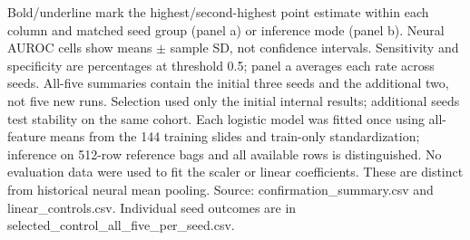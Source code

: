 \begin{table}[H]
\begin{tabularx}{\textwidth}{@{}>{\raggedright\arraybackslash}Xlcccc@{}}
\bottomrule
\end{tabularx}
\par\medskip\footnotesize Bold/underline mark the highest/second-highest point estimate within each column and matched seed group (panel a) or inference mode (panel b). Neural AUROC cells show means $\pm$ sample SD, not confidence intervals. Sensitivity and specificity are percentages at threshold 0.5; panel a averages each rate across seeds. All-five summaries contain the initial three seeds and the additional two, not five new runs. Selection used only the initial internal results; additional seeds test stability on the same cohort. Each logistic model was fitted once using all-feature means from the 144 training slides and train-only standardization; inference on 512-row reference bags and all available rows is distinguished. No evaluation data were used to fit the scaler or linear coefficients. These are distinct from historical neural mean pooling. Source: confirmation\_summary.csv and linear\_controls.csv. Individual seed outcomes are in selected\_control\_all\_five\_per\_seed.csv.
\end{table}

